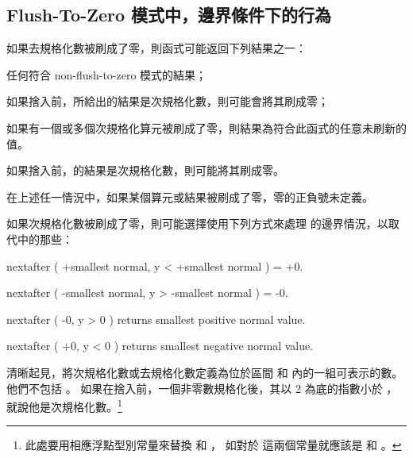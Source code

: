 \subsection[sec:ftzmECB]{Flush-To-Zero 模式中，邊界條件下的行為}

如果去規格化數被刷成了零，則函式可能返回下列結果之一：
\startigNum
\item[item:nftz]任何符合 non-flush-to-zero 模式的結果；

\item 如果捨入前，所給出的結果是次規格化數，則可能會將其刷成零；

\item[item:nfcr] 如果有一個或多個次規格化算元被刷成了零，則結果為符合此函式的任意未刷新的值。

\item 如果捨入前，的結果是次規格化數，則可能將其刷成零。
\stopigNum

在上述任一情況中，如果某個算元或結果被刷成了零，零的正負號未定義。

如果次規格化數被刷成了零，則可能選擇使用下列方式來處理 
的邊界情況，以取代中的那些：

nextafter ( +smallest normal, y < +smallest normal ) = +0.\par
nextafter ( -smallest normal, y > -smallest normal ) = -0.\par
nextafter ( -0, y > 0 ) returns smallest positive normal value.\par
nextafter ( +0, y < 0 ) returns smallest negative normal value.\par

清晰起見，將次規格化數或去規格化數定義為位於區間 
和  內的一組可表示的數。
他們不包括 。
如果在捨入前，一個非零數規格化後，其以 2 為底的指數小於 ，
就說他是次規格化數。\footnote{%
此處要用相應浮點型別常量來替換  和 ，
如對於  這兩個常量就應該是  和 。}

